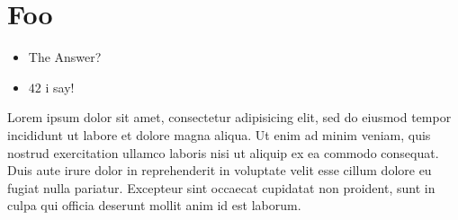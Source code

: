 {
\tableofcontents
}


\section{Foo}


{
\begin{itemize}
\item The Answer?
\item $42$ i say!
\end{itemize}

}


{
\begin{multicols}{2}
% 
Lorem ipsum dolor sit amet, consectetur adipisicing elit, sed do eiusmod tempor incididunt ut labore et dolore magna aliqua. Ut enim ad minim veniam, quis nostrud exercitation ullamco laboris nisi ut aliquip ex ea commodo consequat. Duis aute irure dolor in reprehenderit in voluptate velit esse cillum dolore eu fugiat nulla pariatur. Excepteur sint occaecat cupidatat non proident, sunt in culpa qui officia deserunt mollit anim id est laborum.
\end{multicols}
}
